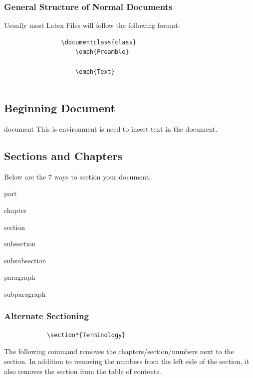 		\subsubsection{General Structure of Normal Documents}
			Usually most Latex Files will follow the following format:
			\begin{verbatim}
				\documentclass{class}
					\emph{Preamble}
				
					\emph{Text}
				
			\end{verbatim} 
	\subsection{Beginning Document}
		\begin{docEnvironment}{document}{}
			This is environment is need to insert text in the document.
		\end{docEnvironment}
	\subsection{Sections and Chapters}
	Below are the 7 ways to section your document. 
		\begin{docCommand}{part}{}
		\end{docCommand}
		\begin{docCommand}{chapter}{}
		\end{docCommand}
		\begin{docCommand}{section}{}
		\end{docCommand}	
		\begin{docCommand}{subsection}{}
		\end{docCommand}
		\begin{docCommand}{subsubsection}{}
		\end{docCommand}
		\begin{docCommand}{paragraph}{}
		\end{docCommand}
		\begin{docCommand}{subparagraph}{}
		\end{docCommand}
	\subsubsection{Alternate Sectioning}
		\begin{verbatim}
			\section*{Terminology}
		\end{verbatim}
			The following command removes the chapters/section/numbers next to the section. In addition to removing the numbers from the left side of the section, it also removes the section from the table of contents.
\newpage

